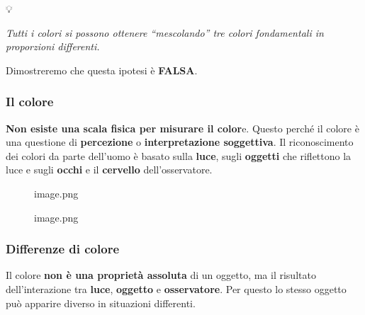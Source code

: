\documentclass[
]{article}
\begin{document}
💡

\emph{Tutti i colori si possono ottenere ``mescolando'' tre colori fondamentali in proporzioni differenti.}

Dimostreremo che questa ipotesi è \textbf{FALSA}.

\hypertarget{il-colore}{%
\subsubsection{Il colore}\label{il-colore}}

\textbf{Non esiste una scala fisica per misurare il color}e. Questo perché il colore è una questione di \textbf{percezione} o \textbf{interpretazione soggettiva}.
Il riconoscimento dei colori da parte dell'uomo è basato sulla \textbf{luce}, sugli \textbf{oggetti} che riflettono la luce e sugli \textbf{occhi} e il \textbf{cervello} dell'osservatore.

\begin{figure}
\centering
{image.png}
\caption{image.png}
\end{figure}

\hypertarget{differenze-di-colore}{%
\subsubsection{Differenze di colore}\label{differenze-di-colore}}

Il colore \textbf{non è una proprietà assoluta} di un oggetto, ma il risultato dell'interazione tra \textbf{luce}, \textbf{oggetto} e \textbf{osservatore}. Per questo lo stesso oggetto può apparire diverso in situazioni differenti.
\end{document}
